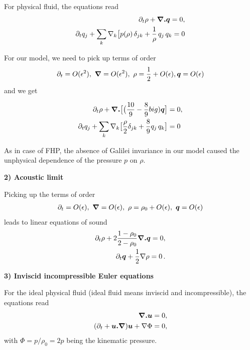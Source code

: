 For physical fluid, the equations read
\begin{align}
\begin{split}
\partial_t \rho + \bm{\nabla . q} = 0, \\
\partial_t q_j + \sum_k \nabla_k \big[ p(\rho) \, \delta_{jk} + \frac{1}{\rho} \, q_j \, q_k = 0
\end{split}
\end{align}

For our model, we need to pick up terms of order
\begin{align}
\begin{split}
\partial_t = O(\epsilon^2), ~ \bm{\nabla} = O(\epsilon^2),~\rho = \frac{1}{2} + O(\epsilon), \bm{q} = O(\epsilon) 
\end{split}
\end{align}
and we get

\begin{align}
\begin{split} \label{O2}
\partial_t \rho + \bm{\nabla.} \big[ \big( \frac{10}{9} - \frac{8}{9} big) \bm{q} \big] &= 0,\\
\partial_t q_j + \sum_k \nabla_k \big[\frac{\rho}{2} \delta_{jk} + \frac{8}{9}q_j\,q_k \big] &= 0
\end{split}
\end{align}

As in case of FHP, the absence of Galilei invariance in our model caused the unphysical dependence of the pressure $p$ on $\rho$.

\bigskip

\textbf{2) Acoustic limit}

Picking up the terms of order
\begin{align}
\partial_t = O(\epsilon),~ \bm{\nabla} = O(\epsilon),~ \rho = \rho_0 + O(\epsilon),~ \bm{q} = O(\epsilon)
\end{align}
leads to linear equations of sound
\begin{align}
\begin{split}
\partial_t \rho + 2\frac{1-\rho_0}{2-\rho_0} \bm{\nabla . q} = 0, \\
\partial_t \bm{q} + \frac{1}{2} \nabla \rho = 0 \,.
\end{split}
\end{align}



\textbf{3) Inviscid incompressible Euler equations}

For the ideal physical fluid (ideal fluid means inviscid and incompressible), the equations read
\begin{align} \label{ideal_phys}
\begin{split}
\bm{\nabla . u} &= 0, \\
(\partial_t + \bm{u.\nabla})\bm{u} + \nabla \Phi &= 0,
\end{split}
\end{align}
with $\Phi = p / \rho_0 = 2 p$ being the kinematic pressure.


